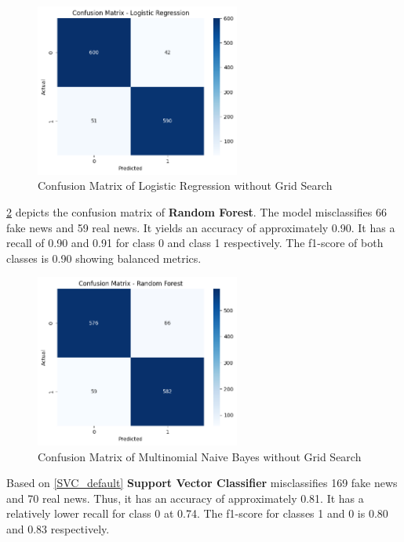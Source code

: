 \begin{figure}[h!]
    \centering
    \includegraphics[width=0.6\textwidth,height=0.6\textheight, keepaspectratio]{figures/hyperparam/LR_default.png}
        \caption{Confusion Matrix of Logistic Regression without Grid Search}
        \label{LR_default}
\end{figure}

\ref{RF_default} depicts the confusion matrix of \textbf{Random Forest}. The model misclassifies 66 fake news and 59 real news. It yields an accuracy of approximately 0.90. It has a recall of 0.90 and 0.91 for class 0 and class 1 respectively. The f1-score of both classes is 0.90 showing balanced metrics.

\begin{figure}[h!]
    \centering
    \includegraphics[width=0.6\textwidth,height=0.6\textheight, keepaspectratio]{figures/hyperparam/RF_default.png}
        \caption{Confusion Matrix of Multinomial Naive Bayes without Grid Search}
        \label{RF_default}
\end{figure}

Based on \ref{SVC_default} \textbf{Support Vector Classifier} misclassifies 169 fake news and 70 real news. Thus, it has an accuracy of approximately 0.81. It has a relatively lower recall for class 0 at 0.74. The f1-score for classes 1 and 0 is 0.80 and 0.83 respectively. 

